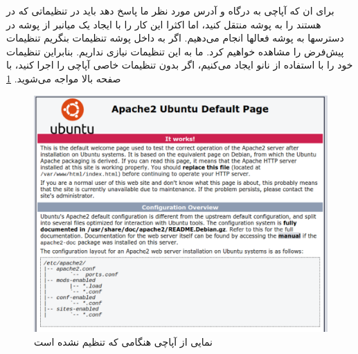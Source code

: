 برای ان که آپاچی به درگاه و آدرس مورد نظر ما پاسخ دهد باید در تنظیماتی که در 
 هستند را به پوشه 
 منتقل کنید، اما اکثرا این کار را با ایجاد یک میانبر از پوشه در دسترسها به پوشه فعالها انجام می‌دهیم. اگر به داخل پوشه تنظیمات 
 بنگریم تنظیمات پیش‌فرض را مشاهده خواهیم کرد. ما به این تنظیمات نیازی نداریم. بنابراین تنظیمات خود را با استفاده از نانو 
  ایجاد می‌کنیم، اگر بدون تنظیمات خاصی آپاچی را اجرا کنید، با صفحه بالا مواجه می‌شوید. \ref{UbuntuServer-Apache}

\begin{figure}
    \includegraphics[width=.9\textwidth ,height=.65\textwidth]{Pic/UbuntuServer5}
    \caption{ نمایی از  آپاچی هنگامی که تنظیم نشده است}
    \label{UbuntuServer-Apache}
\end{figure}
